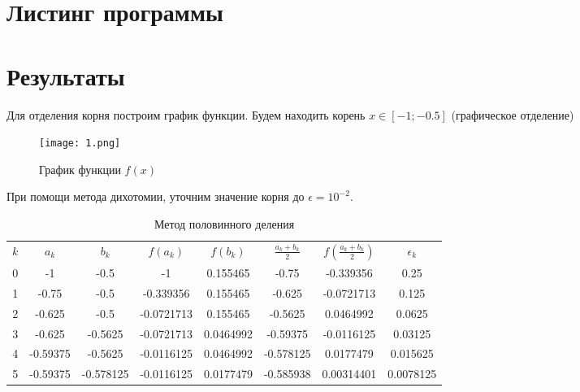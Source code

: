 \documentclass[12pt, a4paper]{article}
\begin{document}
	 \section{Листинг программы}
	 
	
	 
	 
	 \section{Результаты}
	 
	 Для отделения корня построим график функции. Будем находить корень $x \in [-1; -0.5]$ (графическое отделение)
	 
	 	 \begin{figure}[H]
		\texttt{[image: 1.png]}
	 	\centering
	 	\caption{График функции $f(x)$}
	 	\label{img:1}
	 	\centering
	 \end{figure}

	 
	 При помощи метода дихотомии, уточним значение корня до $\epsilon = 10^{-2}$.
	 
	 \begin{table}[H]
	 	\label{tabl}
	 	\centering
	 	\begin{tabular}{|c|c|c|c|c|c|c|c|}
	 		\hline 
	 		$k$ & $a_k$ & $b_k$ & $f(a_k)$ & $f(b_k)$ & $\frac{a_k+b_k}{2}$ & $f(\frac{a_k+b_k}{2})$ & $\epsilon_k$  \\ 
    0 & -1       & -0.5      & -1         &  0.155465  &             -0.75     &              -0.339356   &      0.25      \\
1 & -0.75    & -0.5      & -0.339356  &  0.155465  &             -0.625    &              -0.0721713  &      0.125     \\
2 & -0.625   & -0.5      & -0.0721713 &  0.155465  &             -0.5625   &               0.0464992  &      0.0625    \\
3 & -0.625   & -0.5625   & -0.0721713 &  0.0464992 &             -0.59375  &              -0.0116125  &      0.03125   \\
4 & -0.59375 & -0.5625   & -0.0116125 &  0.0464992 &             -0.578125 &               0.0177479  &      0.015625  \\
5 & -0.59375 & -0.578125 & -0.0116125 &  0.0177479 &             -0.585938 &               0.00314401 &      0.0078125 \\
			\hline
	 	\end{tabular} 
		\caption{Метод половинного деления}
		\label{table:1}
	 \end{table}
 
\end{document}
